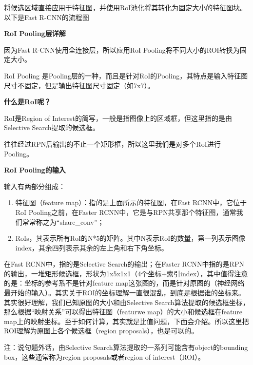 将候选区域直接应用于特征图，并使用RoI池化将其转化为固定大小的特征图块。以下是Fast
R-CNN的流程图

\begin{figure}
\centering
\caption{}
\end{figure}

\textbf{RoI Pooling层详解}

因为Fast R-CNN使用全连接层，所以应用RoI
Pooling将不同大小的ROI转换为固定大小。

RoI Pooling
是Pooling层的一种，而且是针对RoI的Pooling，其特点是输入特征图尺寸不固定，但是输出特征图尺寸固定（如7x7）。

\textbf{什么是RoI呢？}

RoI是Region of
Interest的简写，一般是指图像上的区域框，但这里指的是由Selective
Search提取的候选框。

\begin{figure}
\centering
\caption{}
\end{figure}

往往经过RPN后输出的不止一个矩形框，所以这里我们是对多个RoI进行Pooling。

\textbf{RoI Pooling的输入}

输入有两部分组成：

\begin{enumerate}
\def\labelenumi{\arabic{enumi}.}
\item
  特征图（feature map）：指的是上面所示的特征图，在Fast
  RCNN中，它位于RoI Pooling之前，在Faster
  RCNN中，它是与RPN共享那个特征图，通常我们常常称之为``share\_conv''；
\item
  RoIs，其表示所有RoI的N*5的矩阵。其中N表示RoI的数量，第一列表示图像index，其余四列表示其余的左上角和右下角坐标。
\end{enumerate}

在Fast RCNN中，指的是Selective Search的输出；在Faster
RCNN中指的是RPN的输出，一堆矩形候选框，形状为1x5x1x1（4个坐标+索引index），其中值得注意的是：坐标的参考系不是针对feature
map这张图的，而是针对原图的（神经网络最开始的输入）。其实关于ROI的坐标理解一直很混乱，到底是根据谁的坐标来。其实很好理解，我们已知原图的大小和由Selective
Search算法提取的候选框坐标，那么根据``映射关系''可以得出特征图（featurwe
map）的大小和候选框在feature
map上的映射坐标。至于如何计算，其实就是比值问题，下面会介绍。所以这里把ROI理解为原图上各个候选框（region
proposals），也是可以的。

注：说句题外话，由Selective
Search算法提取的一系列可能含有object的bounding box，这些通常称为region
proposals或者region of interest（ROI）。


